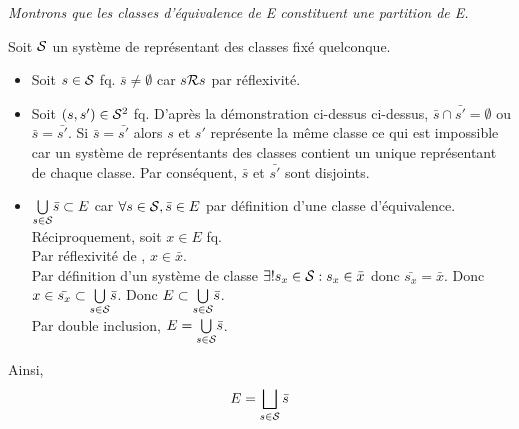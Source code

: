 \documentclass{article}
\begin{document}
\begin{question_kholle}
	\textit{Montrons que les classes d'équivalence de E constituent une partition de E.}

	Soit $\mathcal S$ un système de représentant des classes fixé quelconque.

	\begin{itemize}[label=\textemdash]
		\item Soit $s\in \mathcal S$ fq. $\bar{s} \neq \emptyset$ car $s \mathcal R s$ par réflexivité.
		\item Soit $(s, s') \in \mathcal S^2$ fq. D'après la démonstration ci-dessus ci-dessus, $\bar{s} \cap \bar{s'} = \emptyset$ ou $\bar{s} = \bar{s'}$. Si $\bar{s} = \bar{s'}$ alors $s$ et $s'$ représente la même classe ce qui est impossible car un système de représentants des classes contient un unique représentant de chaque classe. Par conséquent, $\bar{s}$ et $\bar{s'}$ sont disjoints.
		\item $\underset{s \in \mathcal S}{\bigcup} \bar{s} \subset E$ car $\forall s \in \mathcal S, \bar{s} \in E$ par définition d'une classe d'équivalence. \\
		      Réciproquement, soit $x \in E$ fq. \\
		      Par réflexivité de \Rel, $x \in \bar{x}$. \\
		      Par définition d'un système de classe $\exists ! s_x \in \mathcal S : s_x \in \bar{x}$ donc $\bar{s_x} = \bar{x}$. Donc $x \in \bar{s_x} \subset \underset{s \in \mathcal S}{\bigcup} \bar{s}$. Donc $E \subset \underset{s \in \mathcal S}{\bigcup} \bar{s}$. \\
		      Par double inclusion, $E = \underset{s \in \mathcal S}{\bigcup} \bar{s}$.
	\end{itemize}

	Ainsi,
	\begin{equation}
		E = \bigsqcup_{s \in \mathcal S} \bar{s}
	\end{equation}

\end{question_kholle}
\end{document}
